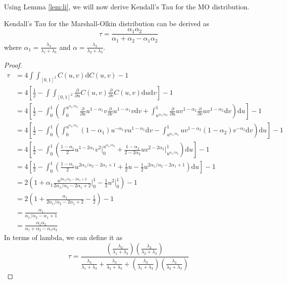 Using Lemma \ref{lem:li}, we will now derive Kendall's Tau for the MO distribution.
\begin{theorem}\label{theorem:MOtau}
    Kendall's Tau for the Marshall-Olkin distribution can be derived as $$\tau=\frac{\alpha_1\alpha_2}{\alpha_1+\alpha_2-\alpha_1\alpha_2}$$ where $\alpha_1=\frac{\lambda_3}{\lambda_1+\lambda_3}$ and $\alpha=\frac{\lambda_3}{\lambda_2+\lambda_3}$.
\end{theorem}
\begin{proof}
    \begin{align*}
        \tau&=4\int\int_{[0,1]^2}C\left(u,v\right)\mathrm{d}C\left(u,v\right)-1\\
        &=4\left[\frac{1}{2}-\int\int_{[0,1]^2}\frac{\partial}{\partial u}C\left(u,v\right)\frac{\partial}{\partial v}C\left(u,v\right)\mathrm{d}u\mathrm{d}v\right]-1\\
        &=4\left[\frac{1}{2}-\int_0^1\left(\int_0^{u^{\alpha_1/\alpha_2}}\frac{\partial}{\partial u}u^{1-\alpha_1}v\frac{\partial}{\partial v}u^{1-\alpha_1}v\mathrm{d}v+\int_{u^{\alpha_1/\alpha_2}}^1\frac{\partial}{\partial u}uv^{1-\alpha_2}\frac{\partial}{\partial v}uv^{1-\alpha_2}\mathrm{d}v\right)\mathrm{d}u\right]-1\\
        &=4\left[\frac{1}{2}-\int_0^1\left(\int_0^{u^{\alpha_1/\alpha_2}}\left(1-\alpha_1\right)u^{-\alpha_1}vu^{1-\alpha_1}\mathrm{d}v-\int_{u^{\alpha_1/\alpha_2}}^1uv^{1-\alpha_2}\left(1-\alpha_2\right)v^{-\alpha_2}\mathrm{d}v\right)\mathrm{d}u\right]-1\\
        &=4\left[\frac{1}{2}-\int_0^1\left(\frac{1-\alpha_1}{2}u^{1-2\alpha_1}v^2\bigg|_0^{u^{\alpha_1/\alpha_2}}+\frac{1-\alpha_2}{2-2\alpha_2}uv^{2-2\alpha_2}\bigg|_{u^{\alpha_1/\alpha_2}}^1\right)\mathrm{d}u\right]-1\\
        &=4\left[\frac{1}{2}-\int_0^1\left(\frac{1-\alpha_1}{2}u^{2\alpha_1/\alpha_2-2\alpha_1+1}+\frac{1}{2}u-\frac{1}{2}u^{2\alpha_1/\alpha_2-2\alpha_1+1}\right)\mathrm{d}u\right]-1\\
        &=2\left(1+\alpha_1\frac{u^{2\alpha_1/\alpha_2-2\alpha_1+2}}{2\alpha_1/\alpha_2-2\alpha_1+2}\bigg|_0^1-\frac{1}{2}u^2\bigg|_0^1\right)-1\\
        &=2\left(1+\frac{\alpha_1}{2\alpha_1/\alpha_2-2\alpha_1+2}-\frac{1}{2}\right)-1\\
        &=\frac{\alpha_1}{\alpha_1/\alpha_2-\alpha_1+1}\\
        &=\frac{\alpha_1\alpha_2}{\alpha_1+\alpha_2-\alpha_1\alpha_2}
    \end{align*}
    In terms of lambda, we can define it as $$\tau=\frac{\left(\frac{\lambda_3}{\lambda_1+\lambda_3}\right)\left(\frac{\lambda_3}{\lambda_2+\lambda_3}\right)}{\frac{\lambda_3}{\lambda_1+\lambda_3}+\frac{\lambda_3}{\lambda_2+\lambda_3}+\left(\frac{\lambda_3}{\lambda_1+\lambda_3}\right)\left(\frac{\lambda_3}{\lambda_2+\lambda_3}\right)}$$
\end{proof}
